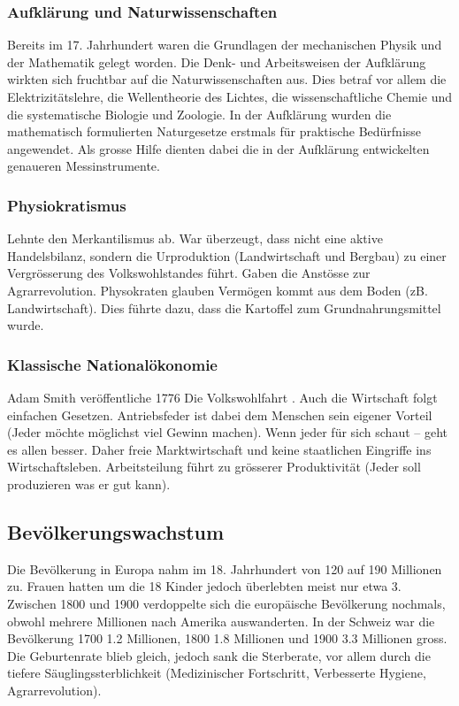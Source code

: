 \documentclass[10pt, openright=true]{scrartcl}
\begin{document}
\subsubsection{Aufklärung und Naturwissenschaften}
Bereits im 17. Jahrhundert waren die Grundlagen der mechanischen Physik und der Mathematik gelegt worden. Die Denk- und Arbeitsweisen der Aufklärung wirkten sich fruchtbar auf die Naturwissenschaften aus. Dies betraf vor allem die Elektrizitätslehre, die Wellentheorie des Lichtes, die wissenschaftliche Chemie und die systematische Biologie und Zoologie. In der Aufklärung wurden die mathematisch formulierten Naturgesetze erstmals für praktische
Bedürfnisse angewendet. Als grosse Hilfe dienten dabei die in der Aufklärung entwickelten genaueren Messinstrumente. 
\subsubsection{Physiokratismus}
Lehnte den Merkantilismus ab. War überzeugt, dass nicht eine aktive Handelsbilanz, sondern die Urproduktion (Landwirtschaft und Bergbau) zu einer Vergrösserung des Volkswohlstandes führt. Gaben die Anstösse zur Agrarrevolution. Physokraten glauben Vermögen kommt aus dem Boden (zB. Landwirtschaft). Dies führte dazu, dass die Kartoffel zum Grundnahrungsmittel wurde.
\subsubsection{Klassische Nationalökonomie}
Adam Smith veröffentliche 1776 \glqq Die Volkswohlfahrt \grqq . Auch die Wirtschaft folgt einfachen Gesetzen. Antriebsfeder ist dabei dem Menschen sein eigener Vorteil (Jeder möchte möglichst viel Gewinn machen). Wenn jeder für sich schaut – geht es allen besser. Daher freie Marktwirtschaft und keine staatlichen Eingriffe ins Wirtschaftsleben. Arbeitsteilung führt zu grösserer Produktivität (Jeder soll produzieren was er gut kann). 
\subsection{Bevölkerungswachstum}
Die Bevölkerung in Europa nahm im 18. Jahrhundert von 120 auf 190 Millionen zu. Frauen hatten um die 18 Kinder jedoch überlebten meist nur etwa 3. Zwischen 1800 und 1900 verdoppelte sich die europäische Bevölkerung nochmals, obwohl mehrere Millionen nach Amerika auswanderten. In der Schweiz war die Bevölkerung 1700 1.2 Millionen, 1800 1.8 Millionen und 1900 3.3 Millionen gross. Die Geburtenrate blieb gleich, jedoch sank die Sterberate, vor allem durch die tiefere Säuglingssterblichkeit (Medizinischer Fortschritt, Verbesserte Hygiene, Agrarrevolution).
\end{document}
